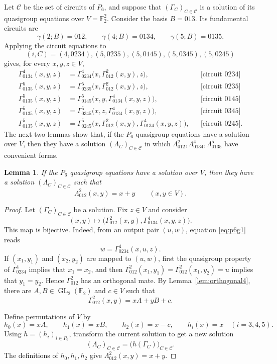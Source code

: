 \documentclass[preprint,12pt]{elsarticle}
\newtheorem{lemma}[theorem]{Lemma}
\theoremstyle{definition}
\newcommand{\F}{\mathbb F}
\newcommand{\GL}{\operatorname{GL}}
\newcommand{\circuittag}[1]{\text{[circuit $#1$]}}
\begin{document}
Let $\mathcal C$ be the set of circuits of $P_6$, and suppose that
$(\Gamma_C)_{C\in\mathcal C}$ is a solution of its quasigroup equations over
$V=\F_2^2$. Consider the basis $B=013$. Its fundamental circuits are
\[
\gamma(2;B)=012,\qquad \gamma(4;B)=0134,\qquad \gamma(5;B)=0135.
\]
Applying the circuit equations to
\[
(i,C)=(4,0234),(5,0235),(5,0145),(5,0345),(5,0245)
\]
gives, for every $x,y,z\in V$,
\begin{align}
\Gamma_{0134}^{4}(x,y,z)
 &=\Gamma_{0234}^{4}\bigl(x,\Gamma_{012}^{2}(x,y),z\bigr),
 &&\circuittag{0234}\label{eq:p6g1}\\
\Gamma_{0135}^{5}(x,y,z)
 &=\Gamma_{0235}^{5}\bigl(x,\Gamma_{012}^{2}(x,y),z\bigr),
 &&\circuittag{0235}\label{eq:p6g2}\\
\Gamma_{0135}^{5}(x,y,z)
 &=\Gamma_{0145}^{5}\bigl(x,y,\Gamma_{0134}^{4}(x,y,z)\bigr),
 &&\circuittag{0145}\label{eq:p6g3}\\
\Gamma_{0135}^{5}(x,y,z)
 &=\Gamma_{0345}^{5}\bigl(x,z,\Gamma_{0134}^{4}(x,y,z)\bigr),
 &&\circuittag{0345}\label{eq:p6g4}\\
\Gamma_{0135}^{5}(x,y,z)
 &=\Gamma_{0245}^{5}\bigl(x,\Gamma_{012}^{2}(x,y),
       \Gamma_{0134}^{4}(x,y,z)\bigr),
 &&\circuittag{0245}.\label{eq:p6g5}
\end{align}
The next two lemmas show that, if the $P_6$ quasigroup equations have a
solution over $V$, then they have a solution $(\Lambda_C)_{C\in\mathcal C}$
in which $\Lambda_{012}^2, \Lambda_{0134}^4,\Lambda_{0135}^5$ have convenient forms.

\begin{lemma}\label{lem:p6-binary}
If the $P_6$ quasigroup equations have a solution over $V$, then they have a
solution $(\Lambda_C)_{C\in\mathcal C}$ such that
\[
\Lambda_{012}^{2}(x,y)=x+y
\qquad(x,y\in V).
\]
\end{lemma}

\begin{proof}
Let $(\Gamma_C)_{C\in\mathcal C}$ be a solution. Fix $z\in V$ and consider
\[
(x,y)\longmapsto
\bigl(\Gamma_{012}^{2}(x,y),\Gamma_{0134}^{4}(x,y,z)\bigr).
\]
This map is bijective. Indeed, from an output pair $(u,w)$, equation
\eqref{eq:p6g1} reads
\[
w=\Gamma_{0234}^{4}(x,u,z).
\]
If $(x_1,y_1)$ and $(x_2,y_2)$ are mapped to $(u,w)$, first the quasigroup 
property of $\Gamma_{0234}^4$ implies that $x_1 = x_2$, and then
$\Gamma_{012}^{2}(x_1,y_1)= \Gamma_{012}^2(x_1,y_2)=u$ implies that $y_1 = y_2$. Hence $\Gamma_{012}^{2}$ has an
orthogonal mate. By Lemma~\ref{lem:orthogonal4}, there are
$A,B\in\GL_2(\F_2)$ and $c\in V$ such that
\[
\Gamma_{012}^{2}(x,y)=xA+yB+c.
\]

Define permutations of $V$ by
\[
h_0(x)=xA,\qquad h_1(x)=xB,\qquad h_2(x)=x-c,
\qquad h_i(x)=x\quad(i=3,4,5).
\]
Using $h=(h_i)_{i\in P_6}$, transform the current solution to get a new solution
\[
(\Lambda_C)_{C\in\mathcal C}
   =\bigl(h(\Gamma_C)\bigr)_{C\in\mathcal C}.
\]
The definitions of $h_0,h_1,h_2$ give
$\Lambda_{012}^{2}(x,y)=x+y$.
\end{proof}
\end{document}
